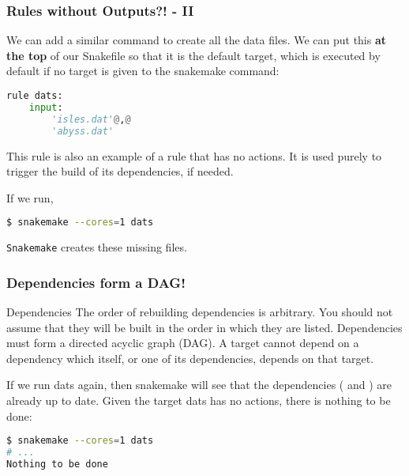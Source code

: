 \begin{frame}[fragile]
  \frametitle{Rules without Outputs?! - II }
  We can add a similar command to create all the data files. We can put this \textbf{at the top} of our Snakefile so that it is the default target, which is executed by default if no target is given to the snakemake command:
  \begin{lstlisting}[language=Python,style=Python]
rule dats:
    input:
        'isles.dat'@,@
        'abyss.dat'
  \end{lstlisting}
  This rule is also an example of a rule that has no actions. It is used purely to trigger the build of its dependencies, if needed.

  If we run,
  \begin{lstlisting}[language=Bash, style=Shell] 
$ snakemake --cores=1 dats
  \end{lstlisting}
  \texttt{Snakemake} creates these missing files.
\end{frame}

\begin{frame}[fragile]
  \frametitle{Dependencies form a DAG!}
  \begin{exampleblock}{Dependencies}
    The order of rebuilding dependencies is arbitrary. You should not assume that they will be built in the order in which they are listed.
    Dependencies must form a directed acyclic graph (DAG). A target cannot depend on a dependency which itself, or one of its dependencies, depends on that target.
  \end{exampleblock}
  If we run dats again, then snakemake will see that the dependencies ( and ) are already up to date. Given the target dats has no actions, there is nothing to be done:
  \begin{lstlisting}[language=Bash, style=Shell] 
$ snakemake --cores=1 dats
# ...
Nothing to be done
  \end{lstlisting}
\end{frame}

